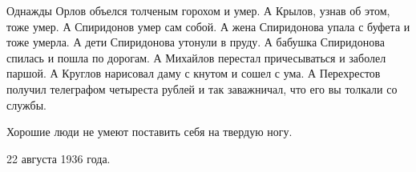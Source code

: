 Однажды Орлов объелся толченым горохом и
умер. А Крылов, узнав об этом, тоже умер. А
Спиридонов умер сам собой. А жена Спиридонова 
упала с буфета и тоже умерла. А дети Спиридонова
утонули в пруду. А бабушка Спиридонова 
спилась и пошла по дорогам. А Михайлов
перестал причесываться и заболел паршой. А
Круглов нарисовал даму с кнутом и сошел с
ума. А Перехрестов получил телеграфом четыреста
 рублей и так заважничал, что его вы
толкали со службы.
    
Хорошие люди не умеют поставить себя на
твердую ногу.
\begin{flushright}
    22 августа 1936 года.
\end{flushright}